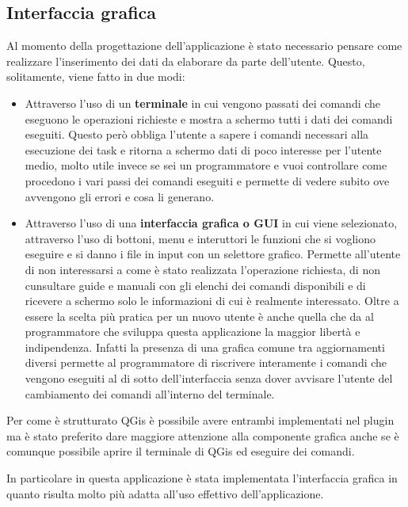 \subsection{Interfaccia grafica}
Al momento della progettazione dell'applicazione è stato necessario pensare come realizzare l'inserimento dei dati da elaborare da parte dell'utente. Questo, solitamente, viene fatto in due modi:
\begin{itemize}

\item Attraverso l'uso di un \textbf{terminale} in cui vengono passati dei comandi che eseguono le operazioni richieste e mostra a schermo tutti i dati dei comandi eseguiti. Questo però obbliga l'utente a sapere i comandi necessari alla esecuzione dei task e ritorna a schermo dati di poco interesse per l'utente medio, molto utile invece se sei un programmatore e vuoi controllare come procedono i vari passi dei comandi eseguiti e permette di vedere subito ove avvengono gli errori e cosa li generano. 

\item Attraverso l'uso di una \textbf{interfaccia grafica o GUI} in cui viene selezionato, attraverso l'uso di bottoni, menu e interuttori le funzioni che si vogliono eseguire e si danno i file in input con un selettore grafico. Permette all'utente di non interessarsi a come è stato realizzata l'operazione richiesta, di non cunsultare guide e manuali con gli elenchi dei comandi disponibili e di ricevere a schermo solo le informazioni di cui è realmente interessato. Oltre a essere la scelta più pratica per un nuovo utente è anche quella che da al programmatore che sviluppa questa applicazione la maggior libertà e indipendenza. Infatti la presenza di una grafica comune tra aggiornamenti diversi permette al programmatore di riscrivere interamente i comandi che vengono eseguiti al di sotto dell'interfaccia senza dover avvisare l'utente del cambiamento dei comandi all'interno del terminale.

\end{itemize}

Per come è strutturato QGis è possibile avere entrambi implementati nel plugin ma è stato preferito dare maggiore attenzione alla componente grafica anche se è comunque possibile aprire il terminale di QGis ed eseguire dei comandi. 

In particolare in questa applicazione è stata implementata l'interfaccia grafica in quanto risulta molto più adatta all'uso effettivo dell'applicazione. 


